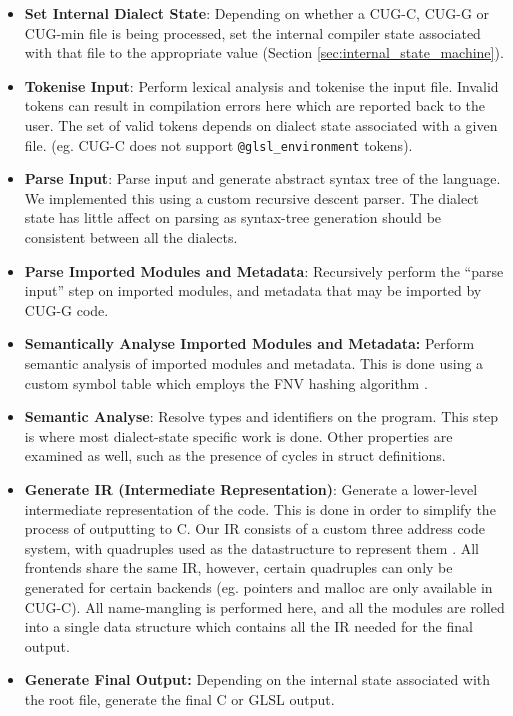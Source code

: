 \documentclass[a4paper,12pt,twoside,openright]{report}
\begin{document}
\begin{itemize}

    \item \textbf{Set Internal Dialect State}: Depending on whether a CUG-C,
    CUG-G or CUG-min file is being processed, set the internal compiler state
    associated with that file to the appropriate value (Section
    \ref{sec:internal_state_machine}).

    \item \textbf{Tokenise Input}: Perform lexical analysis and tokenise the
    input file. Invalid tokens can result in compilation errors here which are
    reported back to the user. The set of valid tokens depends on dialect state
    associated with a given file. (eg. CUG-C does not support
    \texttt{@glsl\_environment} tokens).

    \item \textbf{Parse Input}: Parse input and generate abstract syntax tree
    of the language. We implemented this using a custom recursive descent
    parser. The dialect state has little affect on parsing as syntax-tree
    generation should be consistent between all the dialects.

    \item \textbf{Parse Imported Modules and Metadata}: Recursively perform the
    ``parse input'' step on imported modules, and metadata that may be imported
    by CUG-G code.

    \item \textbf{Semantically Analyse Imported Modules and Metadata:} Perform
    semantic analysis of imported modules and metadata. This is done using a
    custom symbol table which employs the FNV hashing algorithm \cite{FNVHash}.

    \item \textbf{Semantic Analyse}: Resolve types and identifiers on the
    program. This step is where most dialect-state specific work is done. Other
    properties are examined as well, such as the presence of cycles in struct
    definitions.

    \item \textbf{Generate IR (Intermediate Representation)}: Generate a
    lower-level intermediate representation of the code. This is done in order
    to simplify the process of outputting to C. Our IR consists of a custom
    three address code system, with quadruples used as the datastructure to
    represent them \cite{ThreeAddressCode}. All frontends share the same IR,
    however, certain quadruples can only be generated for certain backends (eg.
    pointers and malloc are only available in CUG-C). All name-mangling is
    performed here, and all the modules are rolled into a single data structure
    which contains all the IR needed for the final output.

    \item \textbf{Generate Final Output:} Depending on the internal state
    associated with the root file, generate the final C or GLSL output.

\end{itemize}
\end{document}

